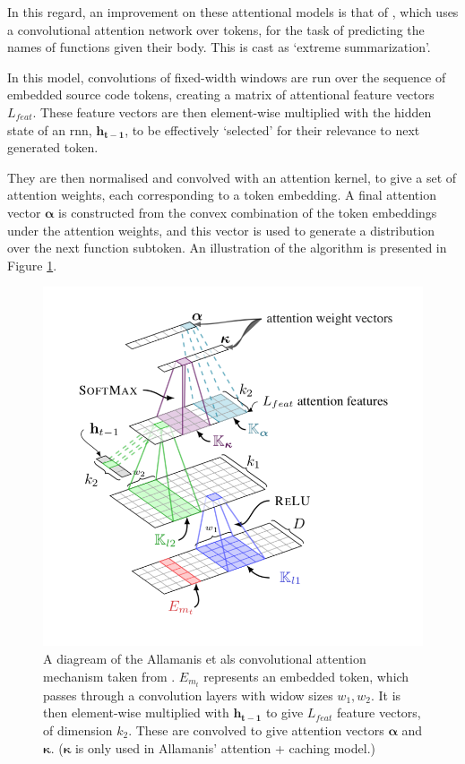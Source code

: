 In this regard, an improvement on these attentional models is that of \citet{allamanis_convolutional_2016}, which uses a convolutional attention network over tokens, for the task of predicting the names of functions given their body. This is cast as `extreme summarization'.

In this model, convolutions of fixed-width windows are run over the sequence of embedded source code tokens, creating a matrix of attentional feature vectors $L_{feat}$.
These feature vectors are then element-wise multiplied with the hidden state of an rnn, $\mathbf{h_{t-1}}$, to be effectively `selected' for their relevance to next generated token. 

They are then normalised and convolved with an attention kernel, to give a set of attention weights, each corresponding to a token embedding. 
A final attention vector $\mathbf{\alpha}$ is constructed from the convex combination of the token embeddings under the attention weights, and this vector is used to generate a distribution over the next function subtoken.
An illustration of the algorithm is presented in Figure \ref{fig:allamanis_conv}.

\begin{figure}[h]
    \centering
    \includegraphics[width=0.6\linewidth]{ModelPics/allamanis_etal.png}
    \caption{A diagream of the Allamanis et als convolutional attention mechanism taken from \citet{allamanis_convolutional_2016}. $E_{m_t}$ represents an embedded token, which passes through a convolution layers with widow sizes $w_1, w_2$. It is then element-wise multiplied with $\mathbf{h_{t-1}}$ to give $L_{feat}$ feature vectors, of dimension $k_2$. These are convolved to give attention vectors $\mathbf{\alpha}$ and $\mathbf{\kappa}$.  ($\mathbf{\kappa}$ is only used in Allamanis' attention + caching model.)  }
    \label{fig:allamanis_conv}
\end{figure}

